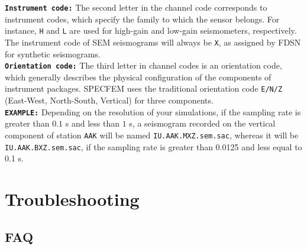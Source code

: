 \documentclass[oneside,english]{book}
\begin{document}
\noindent \textbf{\texttt{Instrument code:}} The second letter in the channel code corresponds to instrument codes, which specify the family to which the sensor belongs. For instance, \texttt{H} and \texttt{L} are used for high-gain and low-gain seismometers, respectively. The instrument code of SEM seismograms will always be \texttt{X}, as assigned by FDSN for synthetic seismograms. \\

\noindent \textbf{\texttt{Orientation code:}} The third letter in channel codes is an orientation code, which generally describes the physical configuration of the components of instrument packages. SPECFEM uses the traditional orientation code  \texttt{E/N/Z} (East-West, North-South, Vertical) for three components. \\

\noindent \textbf{\texttt{EXAMPLE:}} Depending on the resolution of your simulations, if the sampling rate is greater than $0.1$ s and less than $1$ s, a seismogram recorded on the vertical component of station \texttt{AAK} will be named \texttt{IU.AAK.MXZ.sem.sac}, whereas it will be \texttt{IU.AAK.BXZ.sem.sac}, if the sampling rate is greater than 0.0125 and less equal to 0.1 s.



\chapter{\label{cha:Troubleshooting}Troubleshooting}

\section*{FAQ}
\end{document}
